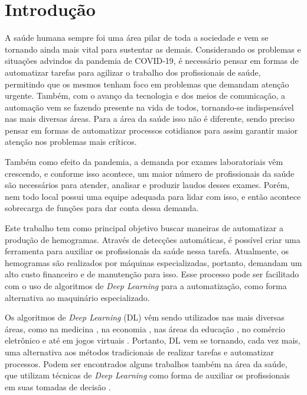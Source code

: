 \chapter{Introdução}
\label{chap:introducao}
A saúde humana sempre foi uma área pilar de toda a sociedade e vem se tornando ainda mais vital para sustentar as demais. Considerando os problemas e situações advindos da pandemia de COVID-19, é necessário pensar em formas de automatizar tarefas para agilizar o trabalho dos profissionais de saúde, permitindo que os mesmos tenham foco em problemas que demandam atenção urgente. Também, com o avanço da tecnologia e dos meios de comunicação, a automação vem se fazendo presente na vida de todos, tornando-se indispensável nas mais diversas áreas. Para a área da saúde isso não é diferente, sendo preciso pensar em formas de automatizar processos cotidianos para assim garantir  maior atenção nos problemas mais críticos.

Também como efeito da pandemia, a demanda por exames laboratoriais vêm crescendo, e conforme isso acontece, um maior número de profissionais da saúde são necessários para atender, analisar e produzir laudos desses exames. Porém, nem todo local possui uma equipe adequada para lidar com isso, e então acontece sobrecarga de funções para dar conta dessa demanda.

Este trabalho tem como principal objetivo buscar maneiras de automatizar a produção de hemogramas. Através de detecções automáticas, é possível criar uma ferramenta para auxiliar os profissionais da saúde nessa tarefa. Atualmente, os hemogramas são realizados por máquinas especializadas, portanto, demandam um alto custo financeiro e de manutenção para isso. Esse processo pode ser facilitado com o uso de algoritmos de \emph{Deep Learning} para a automatização, como forma alternativa ao maquinário especializado.

Os algoritmos de \emph{Deep Learning} (DL) vêm sendo utilizados nas mais diversas áreas, como na medicina \cite{deepLearningMedicine}, na economia \cite{deepLearningEconomy}, nas áreas da educação \cite{deepLearningEducation}, no comércio eletrônico \cite{deepLearningEcommerce} e até em jogos virtuais \cite{deepLearningGaming}. Portanto, DL vem se tornando, cada vez mais, uma alternativa aos métodos tradicionais de realizar tarefas e automatizar processos. Podem ser encontrados alguns trabalhos também na área da saúde, que utilizam técnicas de \emph{Deep Learning} como forma de auxiliar os profissionais em suas tomadas de decisão \cite{deepLearningHealth1, deepLearningHealth2}.

